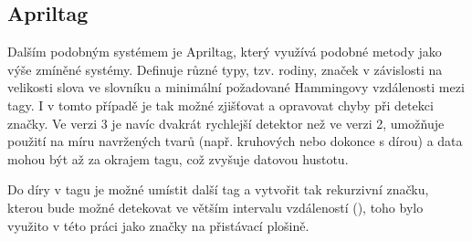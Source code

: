     \subsection{Apriltag}
      Dalším podobným systémem je Apriltag, který využívá podobné metody jako výše zmíněné systémy. Definuje různé typy, tzv. rodiny, značek v závislosti na velikosti slova ve slovníku a minimální požadované Hammingovy vzdálenosti mezi tagy. I v tomto případě je tak možné zjišťovat a opravovat chyby při detekci značky. \cite{apriltag2} Ve verzi 3 je navíc dvakrát rychlejší detektor než ve verzi 2, umožňuje použití na míru navržených tvarů (např. kruhových nebo dokonce s dírou) a data mohou být až za okrajem tagu, což zvyšuje datovou hustotu. \cite{apriltag3}

      Do díry v tagu je možné umístit další tag a vytvořit tak rekurzivní značku, kterou bude možné detekovat ve větším intervalu vzdáleností (\cite{apriltag3}), toho bylo využito v této práci jako značky na přistávací plošině.